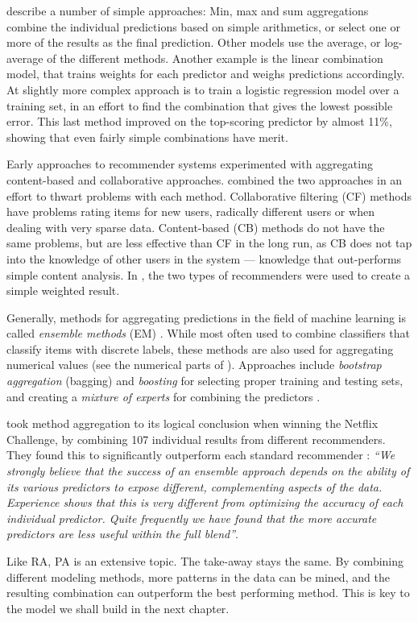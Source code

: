 \cite{Aslam2001} describe a number of simple approaches:
Min, max and sum aggregations combine the individual predictions based on simple arithmetics, 
or select one or more of the results as the final prediction. 
Other models use the average, or log-average of the different methods.
Another example is the linear combination model, that trains weights for each predictor and weighs predictions accordingly.
At slightly more complex approach is to train a logistic regression model \cite[p3]{Aslam2001}
over a training set, in an effort to find the combination that gives the lowest possible error.
This last method improved on the top-scoring predictor by almost 11\%,
showing that even fairly simple combinations have merit.

Early approaches to recommender systems experimented with aggregating content-based and collaborative approaches.
\cite{Claypool1999} combined the two approaches in an effort to thwart problems with each method.
Collaborative filtering (CF) methods have problems rating items for new users, radically different users or when dealing with very sparse data.
Content-based (CB) methods do not have the same problems, but are less effective than CF in the long run, as CB does not tap into the 
knowledge of other users in the system --- knowledge that out-performs simple content analysis.
In \cite{Claypool1999}, the two types of recommenders were used to create a simple weighted result.

Generally, methods for aggregating predictions in the field of machine learning is called \emph{ensemble methods} (EM) \cite{Dietterich2000}.
While most often used to combine classifiers that classify items with discrete labels,
these methods are also used for aggregating numerical values (see the numerical parts of \cite{Breiman1996}).
Approaches include \emph{bootstrap aggregation} (bagging) and \emph{boosting} 
for selecting proper training and testing sets,
and creating a \emph{mixture of experts} for combining the predictors
\cite[p27]{Polikar2006}.


\citeauthor{Bell2007} took method aggregation to its logical conclusion when winning the Netflix Challenge,
by combining 107 individual results from different recommenders.
They found this to significantly outperform each standard recommender \cite[p6]{Bell2007}:
\emph{``We strongly believe that the success of an ensemble approach depends on the ability of its various predictors to expose different, 
complementing aspects of the data. Experience shows that this is very different from optimizing the accuracy of each individual predictor. 
Quite frequently we have found that the more accurate predictors are less useful within the full blend''}.

Like RA, PA is an extensive topic.
The take-away stays the same. By combining different modeling methods,
more patterns in the data can be mined, and 
the resulting combination can outperform the best performing method.
This is key to the model we shall build in the next chapter.

